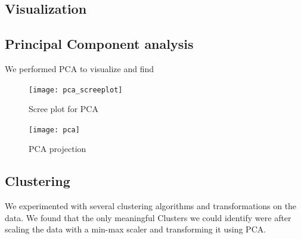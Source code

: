\subsection{Visualization}%
\label{sub:visualization}

\subsection{Principal Component analysis}%
\label{sub:pca}

We performed PCA to visualize and find 

\begin{figure}[H]
  \texttt{[image: pca\_screeplot]}
  \caption{Scree plot for PCA}%
  \label{fig:pca-scree}
\end{figure}

\begin{figure}[H]
  \texttt{[image: pca]}
  \caption{PCA projection}%
  \label{fig:pca}
\end{figure}

\subsection{Clustering}%
\label{sub:clustering}

We experimented with several clustering algorithms and transformations on the data. We
found that the only meaningful Clusters we could identify were after scaling the data with
a min-max scaler and transforming it using PCA.
